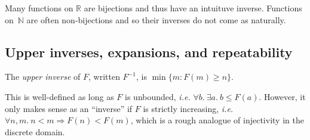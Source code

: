 Many functions on $\mathbb{R}$ are bijections and thus have an intuituve inverse.  
Functions on~$\mathbb{N}$ are often non-bijections and so their inverses
do not come as naturally.

\subsection{Upper inverses, expansions, and repeatability}
\begin{defn} \label{defn: inverse}
The \emph{upper inverse} of $F$, written $F^{-1}$, 
is $\min\{m : F(m)\ge n\}$.\end{defn}
This is well-defined as long as $F$ is unbounded, 
\emph{i.e.} $\forall b.~\exists a.~ b \leq F(a)$.  
However, it only makes sense as an ``inverse'' if $F$ is strictly
increasing, \emph{i.e.} $\forall n,m.~n < m \Rightarrow F(n) < F(m)$, which is
a rough analogue of injectivity in the discrete domain.

